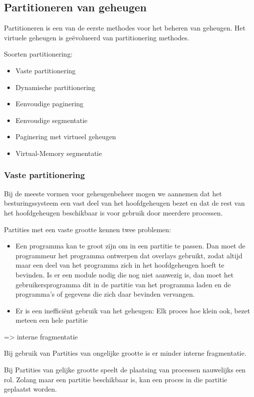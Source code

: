 \subsection{Partitioneren van geheugen}

Partitioneren is een van de eerste methodes voor het beheren van geheugen. Het virtuele geheugen is geëvolueerd van partitionering methodes.

Soorten partitionering:


\begin{itemize}
\item Vaste partitionering
\item Dynamische partitionering
\item Eenvoudige paginering
\item Eenvoudige segmentatie
\item Paginering met virtueel geheugen
\item Virtual-Memory segmentatie
\end{itemize}

\subsubsection{Vaste partitionering}

Bij de meeste vormen voor geheugenbeheer mogen we aannemen dat het besturingssysteem een vast deel van het hoofdgeheugen bezet en dat de rest van het hoofdgeheugen beschikbaar is voor gebruik door meerdere processen.

Partities met een vaste grootte kennen twee problemen:
	
\begin{itemize}
\item Een programma kan te groot zijn om in een partitie te passen. Dan moet de programmeur het programma ontwerpen dat overlays gebruikt, zodat altijd maar een deel van het programma zich in het hoofdgeheugen hoeft te bevinden. Is er een module nodig die nog niet aanwezig is, dan moet het gebruikersprogramma dit in de partitie van het programma laden en de programma’s of gegevens die zich daar bevinden vervangen.
\item Er is een inefficiënt gebruik van het geheugen: Elk proces hoe klein ook, bezet meteen 
een hele partitie
\end{itemize}
=> interne fragmentatie

Bij gebruik van Partities van ongelijke grootte is er minder interne fragmentatie.

Bij Partities van gelijke grootte speelt de plaatsing van processen nauwelijks een rol. Zolang maar een partitie beschikbaar is, kan een proces in die partitie geplaatst worden.

